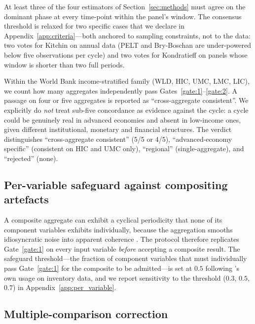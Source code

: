 \begin{gate}
\label{gate:2}
At least three of the four estimators of Section~\ref{sec:methods}
must agree on the dominant phase at every time-point within the
panel's window. The consensus threshold is relaxed for two
specific cases that we declare in
Appendix~\ref{app:criteria}---both anchored to sampling
constraints, not to the data: two votes for Kitchin on annual
data (PELT and Bry-Boschan are under-powered below five
observations per cycle) and two votes for Kondratieff on panels
whose window is shorter than two full periods.
\end{gate}

\begin{gate}
\label{gate:3}
Within the World Bank income-stratified family (WLD, HIC, UMC,
LMC, LIC), we count how many aggregates independently pass
Gates~\ref{gate:1}--\ref{gate:2}. A passage on four or five
aggregates is reported as ``cross-aggregate consistent''. We
explicitly do \emph{not} treat sub-five concordance as evidence
against the cycle: a cycle could be genuinely real in advanced
economies and absent in low-income ones, given different
institutional, monetary and financial structures. The verdict
distinguishes ``cross-aggregate consistent'' (5/5 or 4/5),
``advanced-economy specific'' (consistent on HIC and UMC only),
``regional'' (single-aggregate), and ``rejected'' (none).
\end{gate}

\subsection{Per-variable safeguard against compositing artefacts}
\label{sec:safeguard}

A composite aggregate can exhibit a cyclical periodicity that none
of its component variables exhibits individually, because the
aggregation smooths idiosyncratic noise into apparent coherence
\citep{wen2005}. The protocol therefore replicates Gate~\ref{gate:1}
on every input variable \emph{before} accepting a composite
result. The safeguard threshold---the fraction of component
variables that must individually pass Gate~\ref{gate:1} for the
composite to be admitted---is set at \(0.5\) following
\citet{wen2005}'s own usage on inventory data, and we report
sensitivity to the threshold (\(0.3\), \(0.5\), \(0.7\)) in
Appendix~\ref{app:per_variable}.

\subsection{Multiple-comparison correction}

